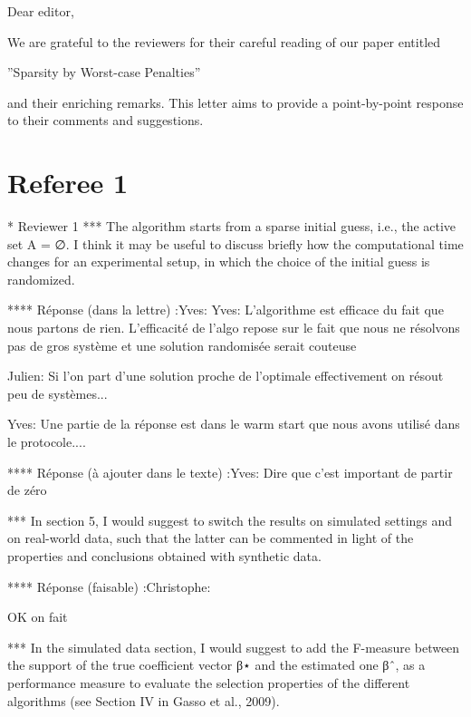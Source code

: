 \documentclass[a4paper,11pt]{texMemo}
\begin{document}
\maketitle
Dear editor,

We are grateful to the reviewers for their careful reading  of
our paper entitled

\begin{center}
  ''Sparsity by Worst-case Penalties''
\end{center}

and their enriching remarks. This letter aims to provide a
point-by-point response to their comments and suggestions.

\section*{Referee 1}

* Reviewer 1
***  The algorithm starts from a sparse initial guess, i.e., the active set A = ∅.
    I think it may be useful to discuss briefly how the computational time
    changes for an experimental setup, in which the choice of the initial guess
    is randomized.

****  Réponse (dans la lettre) :Yves:
Yves: 
L'algorithme est efficace du fait que nous partons de rien.
L'efficacité de l'algo repose sur le fait que nous ne résolvons pas de gros système et une solution randomisée serait couteuse

Julien:
Si l'on part d'une solution proche de l'optimale effectivement on résout peu de systèmes... 

Yves: 
Une partie de la réponse est dans le warm start que nous avons utilisé dans le protocole....

**** Réponse (à ajouter dans le texte) :Yves:
Dire que c'est important de partir de zéro 

*** In section 5,
I would suggest to switch the results on simulated settings and on real-world
data, such that the latter can be commented in light of the properties and
conclusions obtained with synthetic data.

**** Réponse (faisable) :Christophe:

OK on fait 

*** In the simulated data section, 
I would suggest to add the F-measure between the support of the true coefficient
vector β⋆ and the estimated one βˆ, as a performance measure to evaluate the
selection properties of the different algorithms (see Section IV in Gasso et
al., 2009).
\end{document}
